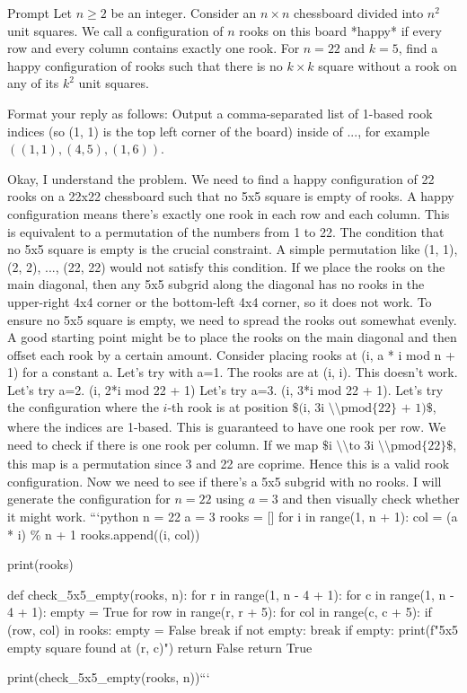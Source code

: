 
\begin{prompt}{Prompt}
Let $n \geq 2$ be an integer. Consider an $n \times n$ chessboard divided into $n^2$ unit squares.
We call a configuration of $n$ rooks on this board *happy* if every row and every column contains exactly one rook. 
For $n=22$ and $k=5$, find a happy configuration of rooks such that there is no $k \times k$ square without a rook on any of its $k^2$ unit squares.

Format your reply as follows:
Output a comma-separated list of 1-based rook indices (so (1, 1) is the top left corner of the board) inside of $\boxed{...}$, for example $\boxed{((1,1), (4,5), (1,6))}$.
\end{prompt}

\begingroup\raggedleft
\begin{geminils}{\geminiflheader}
Okay, I understand the problem. We need to find a happy configuration of 22 rooks on a 22x22 chessboard such that no 5x5 square is empty of rooks. A happy configuration means there's exactly one rook in each row and each column. This is equivalent to a permutation of the numbers from 1 to 22. The condition that no 5x5 square is empty is the crucial constraint. A simple permutation like (1, 1), (2, 2), ..., (22, 22) would not satisfy this condition. If we place the rooks on the main diagonal, then any 5x5 subgrid along the diagonal has no rooks in the upper-right 4x4 corner or the bottom-left 4x4 corner, so it does not work. To ensure no 5x5 square is empty, we need to spread the rooks out somewhat evenly. A good starting point might be to place the rooks on the main diagonal and then offset each rook by a certain amount. Consider placing rooks at (i, a * i mod n + 1) for a constant a. 
Let's try with a=1. The rooks are at (i, i). This doesn't work. 
Let's try a=2. (i, 2*i mod 22 + 1) 
Let's try a=3. (i, 3*i mod 22 + 1).
Let's try the configuration where the $i$-th rook is at position $(i, 3i \\pmod{22} + 1)$, where the indices are 1-based. This is guaranteed to have one rook per row. We need to check if there is one rook per column. If we map $i \\to 3i \\pmod{22}$, this map is a permutation since 3 and 22 are coprime. Hence this is a valid rook configuration.
Now we need to see if there's a 5x5 subgrid with no rooks. I will generate the configuration for $n=22$ using $a=3$ and then visually check whether it might work. 
```python
n = 22
a = 3
rooks = []
for i in range(1, n + 1):
    col = (a * i) \% n + 1
    rooks.append((i, col))
    
    print(rooks)

def check_5x5_empty(rooks, n):
    for r in range(1, n - 4 + 1):
        for c in range(1, n - 4 + 1):
            empty = True
            for row in range(r, r + 5):
                for col in range(c, c + 5):
                    if (row, col) in rooks:
                        empty = False
                        break
                if not empty:
                    break
            if empty:
                print(f"5x5 empty square found at ({r}, {c})")
                return False
    return True

print(check_5x5_empty(rooks, n))```
\end{geminils}
